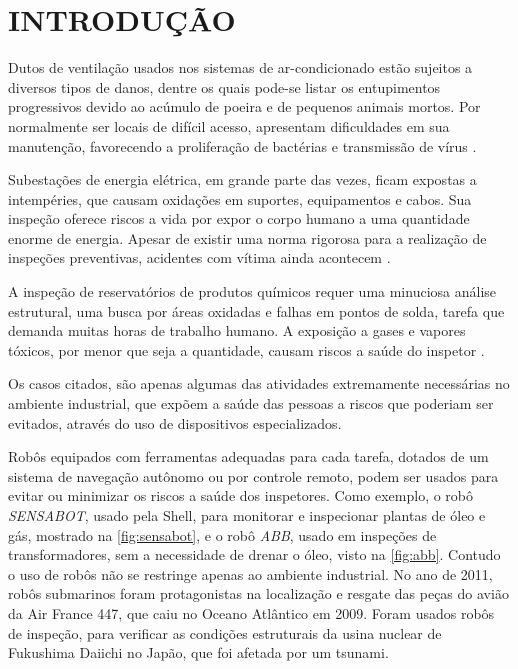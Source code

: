 
\chapter{INTRODUÇÃO}
\label{chap:introducao}

Dutos de ventilação usados nos sistemas de ar-condicionado estão sujeitos a diversos tipos de danos, dentre os quais pode-se listar os entupimentos progressivos devido ao acúmulo de poeira e de pequenos animais mortos.  Por normalmente ser locais de difícil acesso, apresentam dificuldades em sua manutenção, favorecendo a proliferação de bactérias e transmissão de vírus .\par
Subestações de energia elétrica, em grande parte das vezes, ficam expostas a intempéries, que causam oxidações em suportes, equipamentos e cabos. Sua inspeção oferece riscos a vida por expor o corpo humano a uma quantidade enorme de energia. Apesar de existir uma norma rigorosa para a realização de inspeções preventivas, acidentes com vítima ainda acontecem .\par
A inspeção de reservatórios de produtos químicos requer uma minuciosa análise estrutural, uma busca por áreas oxidadas e falhas em pontos de solda, tarefa que demanda muitas horas de trabalho humano. A exposição a gases e vapores tóxicos, por menor que seja a quantidade, causam riscos a saúde do inspetor .\par
Os casos citados, são apenas algumas das atividades extremamente necessárias no ambiente industrial, que expõem a saúde das pessoas a riscos que poderiam ser evitados, através do uso de dispositivos especializados. \par 
Robôs equipados com ferramentas adequadas para cada tarefa, dotados de um sistema de navegação autônomo ou por controle remoto, podem ser usados para evitar ou minimizar os riscos a saúde dos inspetores. Como exemplo, o robô \textit{SENSABOT}, usado pela Shell, para monitorar e inspecionar plantas de óleo e gás, mostrado na \autoref{fig:sensabot}, e o robô \textit{ABB}, usado em inspeções de transformadores, sem a necessidade de drenar o óleo, visto na \autoref{fig:abb}. Contudo o uso de robôs não se restringe apenas ao ambiente industrial. No ano de 2011, robôs submarinos foram protagonistas na localização e resgate das peças do avião da Air France 447, que caiu no Oceano Atlântico em 2009. Foram usados robôs de inspeção, para verificar as condições estruturais da usina nuclear de Fukushima Daiichi no Japão, que foi afetada por um tsunami. 

